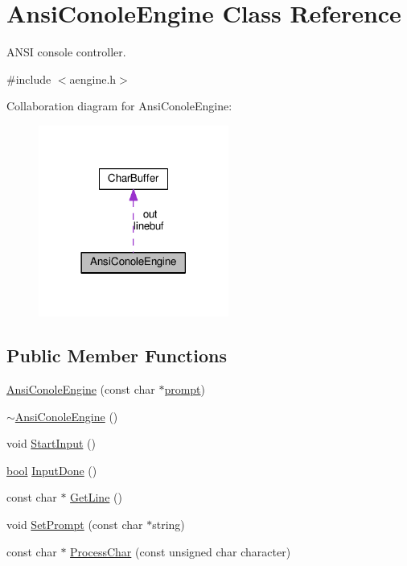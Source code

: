 \hypertarget{classAnsiConoleEngine}{}\section{Ansi\+Conole\+Engine Class Reference}
\label{classAnsiConoleEngine}


A\+N\+SI console controller.  




{\ttfamily \#include $<$aengine.\+h$>$}



Collaboration diagram for Ansi\+Conole\+Engine\+:
\nopagebreak
\begin{figure}[H]
\begin{center}
\leavevmode
\includegraphics[width=177pt]{db/d6d/classAnsiConoleEngine__coll__graph}
\end{center}
\end{figure}
\subsection*{Public Member Functions}
\begin{DoxyCompactItemize}
\item 
\hyperlink{classAnsiConoleEngine_aac394a191db46deb09a08522bdf72218}{Ansi\+Conole\+Engine} (const char $\ast$\hyperlink{classAnsiConoleEngine_a97ebef63ba0490711ed78733b6a87be5}{prompt})
\item 
\hyperlink{classAnsiConoleEngine_a2023846db9703224facd0c2015528dc3}{$\sim$\+Ansi\+Conole\+Engine} ()
\item 
void \hyperlink{classAnsiConoleEngine_a8ad01a2ddd3ee5182deb4a74f3d2a0c1}{Start\+Input} ()
\item 
\hyperlink{platform_8h_a1062901a7428fdd9c7f180f5e01ea056}{bool} \hyperlink{classAnsiConoleEngine_ab136f725541608d36dedcd8ffa24e820}{Input\+Done} ()
\item 
const char $\ast$ \hyperlink{classAnsiConoleEngine_ae3b0bd4c66cb82f4ff939b45bd6e7446}{Get\+Line} ()
\item 
void \hyperlink{classAnsiConoleEngine_a6c5dd4043aadc0b310f976eb10cbcd9f}{Set\+Prompt} (const char $\ast$string)
\item 
const char $\ast$ \hyperlink{classAnsiConoleEngine_a7bb2dea88ddc5ae76643d2303fcc4bf1}{Process\+Char} (const unsigned char character)
\end{DoxyCompactItemize}
